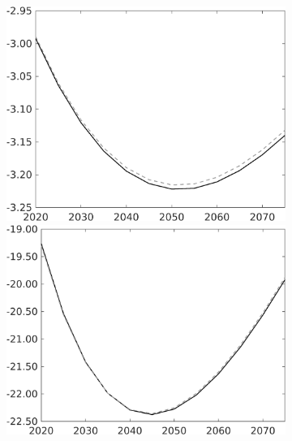 \begin{figure}[h!!]
\begin{subfigure}{0.75\textwidth}
\begin{minipage}[]{0.32\textwidth}
	\end{minipage}
	\begin{minipage}[]{0.32\textwidth}
		\includegraphics[width=1\textwidth]{../../codding_model/own_basedOnFried/optimalPol_010922_revision/figures/all_13Sept22/PerdifNoTauf_Equlab_regime0_CompTaul_EY_spillover0_nsk0_xgr0_knspil1_sep0_LFlimit0_emsbase0_countec0_GovRev0_etaa0.79_lgd0.png}
	\end{minipage}
\begin{minipage}[]{0.32\textwidth}
\includegraphics[width=1\textwidth]{../../codding_model/own_basedOnFried/optimalPol_010922_revision/figures/all_13Sept22/PerdifNoTauf_Equlab_regime0_CompTaul_snS_spillover0_nsk0_xgr0_knspil1_sep0_LFlimit0_emsbase0_countec0_GovRev0_etaa0.79_lgd0.png}

\end{minipage}
\end{subfigure}
\end{figure}
